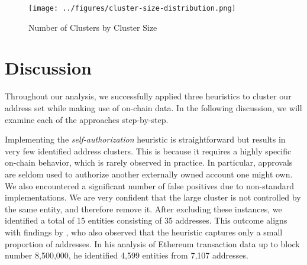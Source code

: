 \documentclass[12pt,a4paper,titlepage,oneside,english]{article}
\begin{document}
\begin{figure}[h]
	\centering
	\texttt{[image: ../figures/cluster-size-distribution.png]}
	\caption{Number of Clusters by Cluster Size}
	\label{fig:barplot_clusters}
\end{figure}



\section{Discussion}
Throughout our analysis, we successfully applied three heuristics to cluster our address set while making use of on-chain data. In the following discussion, we will examine each of the approaches step-by-step.

Implementing the \textit{self-authorization} heuristic is straightforward but results in very few identified address clusters. This is because it requires a highly specific on-chain behavior, which is rarely observed in practice. In particular, approvals are seldom used to authorize another externally owned account one might own. We also encountered a significant number of false positives due to non-standard implementations. We are very confident that the large cluster is not controlled by the same entity, and therefore remove it. After excluding these instances, we identified a total of 15 entities consisting of 35 addresses. This outcome aligns with findings by \cite{FV:17}, who also observed that the heuristic captures only a small proportion of addresses. In his analysis of Ethereum transaction data up to block number 8,500,000, he identified 4,599 entities from 7,107 addresses.
\end{document}
